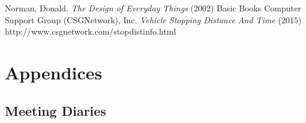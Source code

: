 \documentclass[11pt]{article}
\begin{document}
	\begin{thebibliography}{9}
			 Norman, Donald. \emph{The Design of Everyday Things} (2002) Basic Books
			Computer Support Group (CSGNetwork), Inc. \emph{Vehicle Stopping Distance And Time} (2015) http://www.csgnetwork.com/stopdistinfo.html
	\end{thebibliography}
	

	\section{Appendices} %
	\subsection{Meeting Diaries} %
\end{document}

